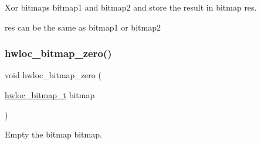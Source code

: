Xor bitmaps {\ttfamily bitmap1} and {\ttfamily bitmap2} and store the result in bitmap {\ttfamily res}. 

{\ttfamily res} can be the same as {\ttfamily bitmap1} or {\ttfamily bitmap2} \mbox{\label{a00205_gaa97c5217613c8cae9862287170ea2132}} 
\subsubsection{\texorpdfstring{hwloc\+\_\+bitmap\+\_\+zero()}{hwloc\_bitmap\_zero()}}
{\footnotesize\ttfamily void hwloc\+\_\+bitmap\+\_\+zero (\begin{DoxyParamCaption}\item[{\hyperlink{a00205_gaa3c2bf4c776d603dcebbb61b0c923d84}{hwloc\+\_\+bitmap\+\_\+t}}]{bitmap }\end{DoxyParamCaption})}



Empty the bitmap {\ttfamily bitmap}. 

